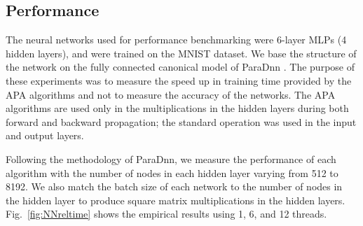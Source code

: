 \documentclass[manuscript]{acmart}
\begin{document}
\subsection{Performance}
\label{sec:NNperf}

The neural networks used for performance benchmarking were 6-layer MLPs (4 hidden layers), and were trained on the MNIST dataset. 
We base the structure of the network on the fully connected canonical model of ParaDnn \cite{WWB20}.
The purpose of these experiments was to measure the speed up in training time provided by the APA algorithms and not to measure the accuracy of the networks. 
The APA algorithms are used only in the multiplications in the hidden layers during both forward and backward propagation; the standard operation was used in the input and output layers. 

Following the methodology of ParaDnn, we measure the performance of each algorithm with the number of nodes in each hidden layer varying from 512 to 8192. 
We also match the batch size of each network to the number of nodes in the hidden layer to produce square matrix multiplications in the hidden layers. 
Fig.~\ref{fig:NNreltime} shows the empirical results using 1, 6, and 12 threads.
\end{document}

